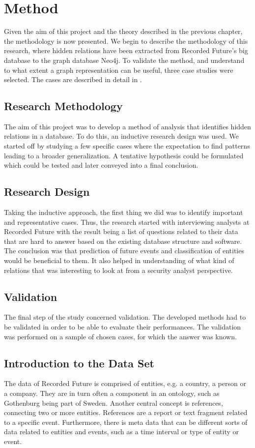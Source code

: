 \chapter{Method}
Given the aim of this project and the theory described in the previous chapter, the methodology is now presented. We begin to describe the methodology of this research, where hidden relations have been extracted from Recorded Future's big database to the graph database Neo4j. To validate the method, and understand to what extent a graph representation can be useful, three case studies were selected. The cases are described in detail in .

\section{Research Methodology}
The aim of this project was to develop a method of analysis that identifies hidden relations in a database. To do this, an inductive research design was used. We started off by studying a few specific cases where the expectation to find patterns leading to a broader generalization. A tentative hypothesis could be formulated which could be tested and later conveyed into a final conclusion.

\section{Research Design}
Taking the inductive approach, the first thing we did was to identify important and representative cases. Thus, the research started with interviewing analysts at Recorded Future with the result being a list of questions related to their data that are hard to answer based on the existing database structure and software. The conclusion was that prediction of future events and classification of entities would be beneficial to them. It also helped in understanding of what kind of relations that was interesting to look at from a security analyst perspective.

\section{Validation} 
The final step of the study concerned validation. The developed methods had to be validated in order to be able to evaluate their performances. The validation was performed on a sample of chosen cases, for which the answer was known.

\section{Introduction to the Data Set \label{dataset}}
The data of Recorded Future is comprised of entities, e.g. a country, a person or a company. They are in turn often a component in an ontology, such as Gothenburg being part of Sweden. Another central concept is references, connecting two or more entities. References are a report or text fragment related to a specific event. Furthermore, there is meta data that can be different sorts of data related to entities and events, such as a time interval or type of entity or event.

